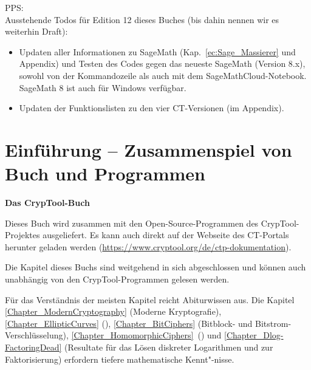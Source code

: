 \vfill
PPS:\\
Ausstehende Todos für Edition 12 dieses Buches (bis dahin nennen wir es weiterhin Draft):
\begin{itemize}[nosep]
\item Updaten aller Informationen zu SageMath (Kap.~\ref{ec:Sage_Massierer} und Appendix) und Testen des Codes gegen das neueste SageMath (Version 8.x), sowohl von der Kommandozeile als auch mit dem SageMathCloud-Notebook. SageMath 8 ist auch für Windows verfügbar.
   \item Updaten der Funktionslisten zu den vier CT-Versionen (im Appendix).
\end{itemize}











\clearpage
\setcounter{secnumdepth}{-1}  %
\chapter{Einführung -- Zusammenspiel von Buch und Programmen}
\setcounter{secnumdepth}{4}  %

\textbf{Das CrypTool-Buch}

Dieses Buch wird zusammen mit den Open-Source-Programmen des
CrypTool-Projektes ausgeliefert. Es kann auch direkt auf der
Webseite des CT-Portals herunter geladen werden (\url{https://www.cryptool.org/de/ctp-dokumentation}).

Die Kapitel dieses Buchs sind weitgehend in sich abgeschlossen und können
auch unabhängig von den CrypTool-Programmen gelesen werden.

Für das Verständnis der meisten Kapitel reicht Abiturwissen aus. Die Kapitel
\ref{Chapter_ModernCryptography} (\glqq Moderne Kryptografie\grqq), %
\ref{Chapter_EllipticCurves} (\glqq {}\grqq),
\ref{Chapter_BitCiphers} (\glqq Bitblock- und Bitstrom-Verschlüsselung\grqq), %
\ref{Chapter_HomomorphicCiphers}~(\glqq {}\grqq) und
\ref{Chapter_Dlog-FactoringDead} (\glqq Resultate für das Lösen diskreter Logarithmen und zur Faktorisierung\grqq) %
erfordern tiefere mathematische Kennt"-nisse.

